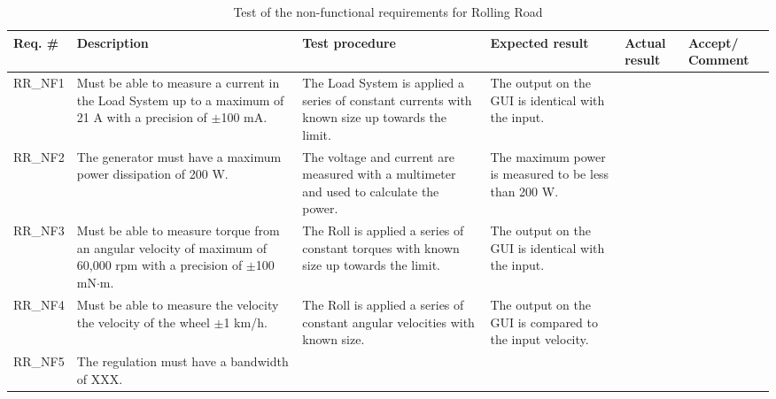 \begin{table}[h!]
	\centering
	\label{my-label}
	\begin{tabular}{|p{1.5 cm}|p{2.1 cm}|p{2.1 cm}|p{2.1 cm}|p{2.1 cm}|p{2.1 cm}|}
		\hline
		\textbf{Req. \#} & \textbf{Description} & \textbf{Test procedure} & 
		\textbf{Expected result} & \textbf{Actual result} & \textbf{Accept/ Comment} \\ \hline
		RR\_NF1 
			& Must be able to measure a current in the Load System up to a maximum of 21 A with a precision of $\pm$100 mA.
			& The Load System is applied a series of constant currents with known size up towards the limit.
			& The output on the GUI is identical with the input.
			& 
			& \\ \hline
		RR\_NF2 
			& The generator must have a maximum power dissipation of 200 W.
			& The voltage and current are measured with a multimeter and used to calculate the power.
			& The maximum power is measured to be less than 200 W.
			&
			& \\ \hline
		RR\_NF3 
			& Must be able to measure torque from an angular velocity of maximum of 60,000 rpm with a precision of $\pm$100 mN$\cdot$m.
			& The Roll is applied a series of constant torques with known size up towards the limit.
			& The output on the GUI is identical with the input.
			& 
			& \\ \hline
		RR\_NF4 
			& Must be able to measure the velocity the velocity of the wheel $\pm$1 km/h.
			& The Roll is applied a series of constant angular velocities with known size.
			& The output on the GUI is compared to the input velocity.
			& 
			& \\ \hline
		RR\_NF5 
			& The regulation must have a bandwidth of XXX.
			& 
			& 
			& 
			& \\ \hline
	\end{tabular}
	\caption{Test of the non-functional requirements for Rolling Road}
\end{table}